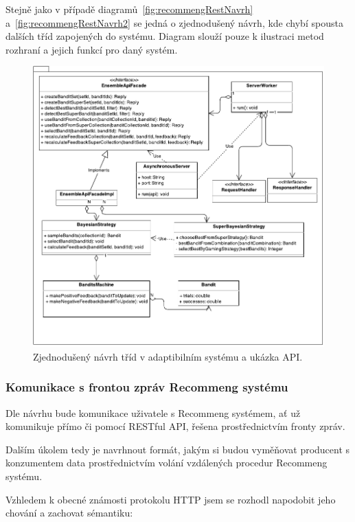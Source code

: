 \documentclass[thesis=M,czech]{FITthesis}[2014/05/07]
\begin{document}
Stejně jako v případě diagramů~\ref{fig:recommengRestNavrh} a~\ref{fig:recommengRestNavrh2} se jedná o zjednodušený návrh, kde chybí spousta dalších tříd zapojených do systému. Diagram slouží pouze k ilustraci metod rozhraní a jejich funkcí pro daný systém.

\begin{figure}\centering
	\includegraphics[width=1.0\textwidth]{obr/ensembleDiagram.pdf}
 	\caption[Zjednodušený návrh tříd v adaptibilním systému a ukázka API.]{Zjednodušený návrh tříd v adaptibilním systému a ukázka API.}\label{fig:recommengNavrh}
\end{figure}	

\subsubsection{Komunikace s frontou zpráv Recommeng systému}

Dle návrhu bude komunikace uživatele s Recommeng systémem, ať už komunikuje přímo či pomocí RESTful API, řešena prostřednictvím fronty zpráv.

Dalším úkolem tedy je navrhnout formát, jakým si budou vyměňovat producent s konzumentem data prostřednictvím volání vzdálených procedur Recommeng systému.

Vzhledem k obecné známosti protokolu HTTP jsem se rozhodl napodobit jeho chování a zachovat sémantiku:
\end{document}
